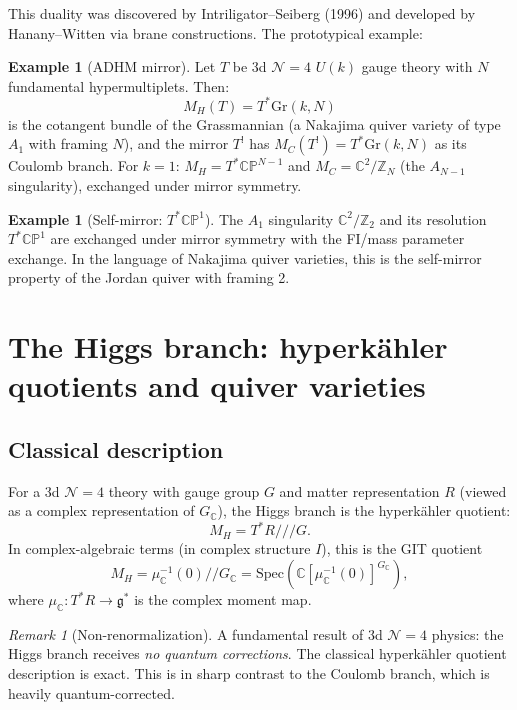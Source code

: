 \documentclass[11pt]{article}
\theoremstyle{definition}
\newtheorem{example}[theorem]{Example}
\theoremstyle{remark}
\newtheorem{remark}[theorem]{Remark}
\newcommand{\Spec}{\mathrm{Spec}}
\newcommand{\cN}{\mathcal{N}}
\newcommand{\frakg}{\mathfrak{g}}
\begin{document}
This duality was discovered by Intriligator--Seiberg (1996) and developed by Hanany--Witten via brane constructions. The prototypical example:

\begin{example}[ADHM mirror]
\label{ex:adhm}
Let $T$ be 3d $\cN=4$ $U(k)$ gauge theory with $N$ fundamental hypermultiplets. Then:
\[
 M_H(T) = T^*\mathrm{Gr}(k, N)
\]
is the cotangent bundle of the Grassmannian (a Nakajima quiver variety of type $A_1$ with framing $N$), and the mirror $T^!$ has $M_C(T^!) = T^*\mathrm{Gr}(k, N)$ as its Coulomb branch. For $k=1$: $M_H = T^*\mathbb{CP}^{N-1}$ and $M_C = \mathbb{C}^2/\mathbb{Z}_N$ (the $A_{N-1}$ singularity), exchanged under mirror symmetry.
\end{example}

\begin{example}[Self-mirror: $T^*\mathbb{CP}^1$]
\label{ex:self-mirror}
The $A_1$ singularity $\mathbb{C}^2/\mathbb{Z}_2$ and its resolution $T^*\mathbb{CP}^1$ are exchanged under mirror symmetry with the FI/mass parameter exchange. In the language of Nakajima quiver varieties, this is the self-mirror property of the Jordan quiver with framing 2.
\end{example}

\section{The Higgs branch: hyperk\"ahler quotients and quiver varieties}
\label{sec:higgs-branch}

\subsection{Classical description}

For a 3d $\cN=4$ theory with gauge group $G$ and matter representation $R$ (viewed as a complex representation of $G_{\mathbb{C}}$), the Higgs branch is the hyperk\"ahler quotient:
\[
 M_H = T^*R \mathbin{/\!\!/\!\!/} G.
\]
In complex-algebraic terms (in complex structure $I$), this is the GIT quotient
\[
 M_H = \mu_{\mathbb{C}}^{-1}(0) /\!/ G_{\mathbb{C}} = \Spec\left(\mathbb{C}[\mu_{\mathbb{C}}^{-1}(0)]^{G_{\mathbb{C}}}\right),
\]
where $\mu_{\mathbb{C}} \colon T^*R \to \frakg^*$ is the complex moment map.

\begin{remark}[Non-renormalization]
\label{rem:non-renorm}
A fundamental result of 3d $\cN=4$ physics: the Higgs branch receives \emph{no quantum corrections}. The classical hyperk\"ahler quotient description is exact. This is in sharp contrast to the Coulomb branch, which is heavily quantum-corrected.
\end{remark}
\end{document}
